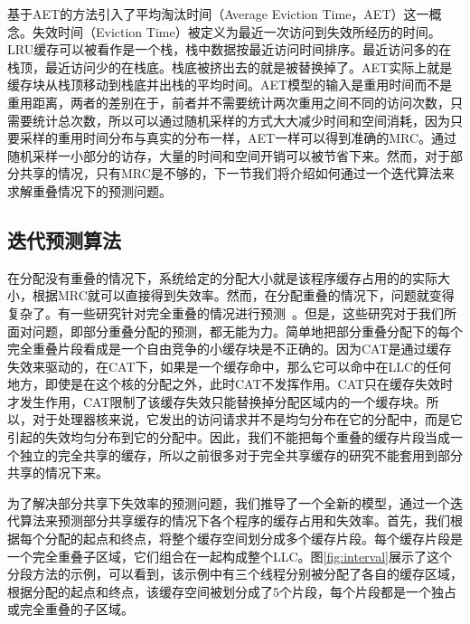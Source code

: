 基于AET的方法引入了平均淘汰时间（Average Eviction Time，AET）这一概念。失效时间（Eviction Time）被定义为最近一次访问到失效所经历的时间。LRU缓存可以被看作是一个栈，栈中数据按最近访问时间排序。最近访问多的在栈顶，最近访问少的在栈底。栈底被挤出去的就是被替换掉了。AET实际上就是缓存块从栈顶移动到栈底并出栈的平均时间。AET模型的输入是重用时间而不是重用距离，两者的差别在于，前者并不需要统计两次重用之间不同的访问次数，只需要统计总次数，所以可以通过随机采样的方式大大减少时间和空间消耗，因为只要采样的重用时间分布与真实的分布一样，AET一样可以得到准确的MRC。通过随机采样一小部分的访存，大量的时间和空间开销可以被节省下来。然而，对于部分共享的情况，只有MRC是不够的，下一节我们将介绍如何通过一个迭代算法来求解重叠情况下的预测问题。


\subsection{迭代预测算法} \label{sec:prediction_iteration}


在分配没有重叠的情况下，系统给定的分配大小就是该程序缓存占用的的实际大小，根据MRC就可以直接得到失效率。然而，在分配重叠的情况下，问题就变得复杂了。有一些研究针对完全重叠的情况进行预测~\parencite{chandra2005predicting, suh2014analytical, xiang2011all, xiang2011linear, hu2016kinect}。但是，这些研究对于我们所面对问题，即部分重叠分配的预测，都无能为力。简单地把部分重叠分配下的每个完全重叠片段看成是一个自由竞争的小缓存块是不正确的。因为CAT是通过缓存失效来驱动的，在CAT下，如果是一个缓存命中，那么它可以命中在LLC的任何地方，即使是在这个核的分配之外，此时CAT不发挥作用。CAT只在缓存失效时才发生作用，CAT限制了该缓存失效只能替换掉分配区域内的一个缓存块。所以，对于处理器核来说，它发出的访问请求并不是均匀分布在它的分配中，而是它引起的失效均匀分布到它的分配中。因此，我们不能把每个重叠的缓存片段当成一个独立的完全共享的缓存，所以之前很多对于完全共享缓存的研究不能套用到部分共享的情况下来。

为了解决部分共享下失效率的预测问题，我们推导了一个全新的模型，通过一个迭代算法来预测部分共享缓存的情况下各个程序的缓存占用和失效率。首先，我们根据每个分配的起点和终点，将整个缓存空间划分成多个缓存片段。每个缓存片段是一个完全重叠子区域，它们组合在一起构成整个LLC。图\ref{fig:interval}展示了这个分段方法的示例，可以看到，该示例中有三个线程分别被分配了各自的缓存区域，根据分配的起点和终点，该缓存空间被划分成了5个片段，每个片段都是一个独占或完全重叠的子区域。

